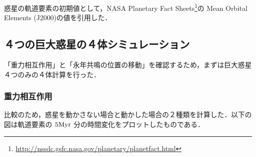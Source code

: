 \documentclass[11pt,a4paper,oneside,onecolumn]{jreport}
\begin{document}
惑星の軌道要素の初期値として，NASA Planetary Fact Sheets\footnote{\url{http://nssdc.gsfc.nasa.gov/planetary/planetfact.html}}の Mean Orbital Elements (J2000)の値を引用した．


\subsection{４つの巨大惑星の４体シミュレーション}
「重力相互作用」と「永年共鳴の位置の移動」を確認するため，まずは巨大惑星４つのみの４体計算を行った．
\subsubsection{重力相互作用}
比較のため，惑星を動かさない場合と動かした場合の２種類を計算した．以下の図は軌道要素の $5 {\rm Myr}$ 分の時間変化をプロットしたものである．
\end{document}
